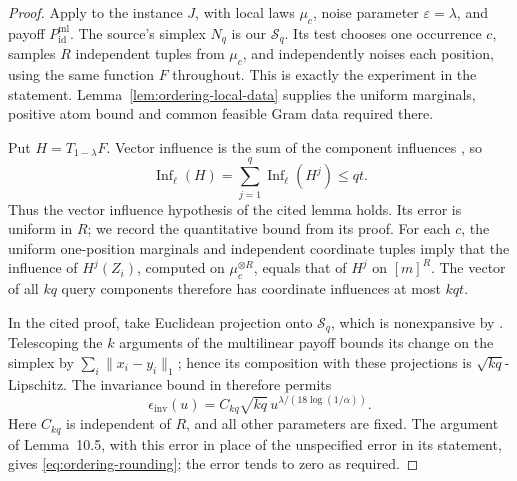 \begin{proof}
Apply \cite[Lemma~10.5]{GuruswamiEtAl2011OrderingCSP} to the
instance \(J\), with local laws \(\mu_c\), noise parameter
\(\varepsilon=\lambda\), and payoff \(P_{\mathrm{id}}^{\mathrm{ml}}\).
The source's simplex \(N_q\) is our \(\mathcal S_q\). Its test
chooses one occurrence \(c\), samples \(R\) independent tuples from
\(\mu_c\), and independently noises each position, using the same
function \(F\) throughout. This is exactly the experiment in the
statement. Lemma~\ref{lem:ordering-local-data} supplies the uniform
marginals, positive atom bound and common feasible Gram data required
there.

Put \(H=T_{1-\lambda}F\). Vector influence is the sum of the
component influences \cite[Definition~2.6]{IsakssonMossel2009}, so
\[
 \operatorname{Inf}_\ell(H)
 =\sum_{j=1}^q\operatorname{Inf}_\ell(H^j)\le qt.
\]
Thus the vector influence hypothesis of the cited lemma holds.
Its error is uniform in \(R\); we record the quantitative bound
from its proof. For each \(c\), the uniform one-position marginals
and independent coordinate tuples imply that the influence of
\(H^j(Z_i)\), computed on \(\mu_c^{\otimes R}\), equals that of
\(H^j\) on \([m]^R\). The vector of all \(kq\) query components
therefore has coordinate influences at most \(kqt\).

In the cited proof, take Euclidean projection onto \(\mathcal S_q\),
which is nonexpansive by \cite[Lemma~3.8]{IsakssonMossel2009}.
Telescoping the \(k\) arguments of the multilinear payoff bounds
its change on the simplex by \(\sum_i\|x_i-y_i\|_1\); hence its
composition with these projections is \(\sqrt{kq}\)-Lipschitz.
The invariance bound in
\cite[Theorem~10.1 and the proof of Lemma~10.5]{GuruswamiEtAl2011OrderingCSP}
therefore permits
\[
 \epsilon_{\mathrm{inv}}(u)=C_{kq}\sqrt{kq}\,
             u^{\lambda/(18\log(1/\alpha))}.
\]
Here \(C_{kq}\) is independent of \(R\), and all other parameters
are fixed. The argument of Lemma~10.5, with this error in place of the
unspecified error in its statement, gives \eqref{eq:ordering-rounding};
the error tends to zero as required.
\end{proof}

